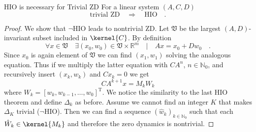 \begin{proposition}{HIO is necessary for Trivial ZD}{}
	For a linear system $(A,C,D)$ 
	\begin{equation}
	\text{trivial ZD} \quad \Rightarrow \quad \text{HIO} \quad .
	\end{equation}
\end{proposition}
\begin{proof}
	We show that $\neg$HIO leads to nontrivial ZD.
	Let $\mathfrak{V}$ be the largest $(A,D)$-invariant subset included in $\kernel{C}$. 
	By definition
	\begin{equation}
	\forall x\in \mathfrak{V} \quad \exists (x_0,w_0) \in \mathfrak{V}\times \mathbb{R}^m 
	\quad | \quad Ax = x_0 + Dw_0 \quad .
	\end{equation}
	Since $x_0$ is again element of $\mathfrak{V}$ we can find $(x_1,w_1)$ solving the 
	analogous equation. Thus if we multiply the latter equation with $CA^n$,
	$n\in\mathbb{N}_0$, and recursively insert $(x_k,w_k)$ and $Cx_k=0$ we get
	\begin{equation}
	CA^{k+1} x = M_k W_k
	\end{equation}
	where $W_k = [w_k,w_{k-1},\ldots,w_0]^\text{T}$. We notice the similarity to the last 
	HIO theorem and define $\Delta_k$ as before. Assume we cannot find an integer $K$ that 
	makes $\Delta_K$ trivial ($\neg$HIO). Then  
	we can find a sequence $(\hat{w}_k)_{k\in\mathbb{N}_0}$ such that each 
	$\hat{W}_k\in\kernel{M_k}$ and therefore the zero dynamics is nontrivial.
\end{proof}